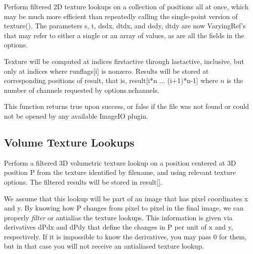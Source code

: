 Perform filtered 2D texture lookups on a collection of positions all at
once, which may be much more efficient than repeatedly calling the
single-point version of {\cf texture()}.  The parameters {\cf s},
{\cf t}, {\cf dsdx}, {\cf dtdx}, and {\cf dsdy}, {\cf dtdy} are now
{\cf VaryingRef}'s that may refer to either a single or an array of
values, as are all the fields in the {\cf options}.

Texture will be computed at indices {\cf firstactive} through
{\cf lastactive}, inclusive, but only at indices where {\cf runflags[i]}
is nonzero.  Results will be stored at corresponding positions of
{\cf result}, that is, 
{\cf result[i*n ... (i+1)*n-1]} where $n$ is the number of channels
requested by {\cf options.nchannels}.

This function returns {\cf true} upon success, or {\cf false} if the
file was not found or could not be opened by any available ImageIO
plugin.
\apiend

\newpage
\subsection{Volume Texture Lookups}
\label{sec:texturesys:api:texture3d}


Perform a filtered 3D volumetric texture lookup on a position centered at
3D position {\cf P} from the texture identified by
{\cf filename}, and using relevant texture {\cf options}.  The filtered
results will be stored in {\cf result[]}.

We assume that this lookup will be part of an image that has pixel
coordinates {\cf x} and {\cf y}.  By knowing how {\cf P} changes from
pixel to pixel in the final image, we can properly \emph{filter} or
antialias the texture lookups.  This information is given via
derivatives {\cf dPdx} and {\cf dPdy} that define the changes in {\cf P}
per unit of {\cf x} and {\cf y}, respectively.  If it is impossible to
know the derivatives, you may pass 0 for them, but in that case you will
not receive an antialiased texture lookup.

